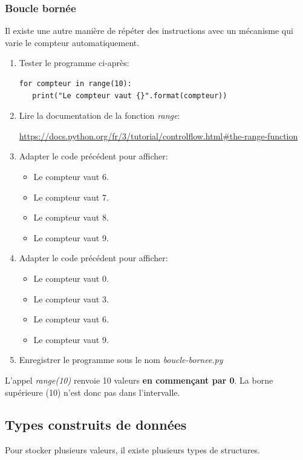 \documentclass[a4paper,11pt]{article}
\begin{document}
\begin{Form}
\subsubsection{Boucle bornée}
Il existe une autre manière de répéter des instructions avec un mécanisme qui varie le compteur automatiquement.
\begin{activite}
\begin{enumerate}
\item Tester le programme ci-après:
\begin{lstlisting}
for compteur in range(10):
   print("Le compteur vaut {}".format(compteur))
\end{lstlisting}
\item Lire la documentation de la fonction \emph{range}:
\begin{center}
\url{https://docs.python.org/fr/3/tutorial/controlflow.html#the-range-function}
\end{center}
\item Adapter le code précédent pour afficher:
\begin{itemize}
\item Le compteur vaut 6.
\item Le compteur vaut 7.
\item Le compteur vaut 8.
\item Le compteur vaut 9.
\end{itemize}
\item Adapter le code précédent pour afficher:
\begin{itemize}
\item Le compteur vaut 0.
\item Le compteur vaut 3.
\item Le compteur vaut 6.
\item Le compteur vaut 9.
\end{itemize}
\item Enregistrer le programme sous le nom \emph{boucle-bornee.py}
\end{enumerate}
\end{activite}
\begin{aretenir}
L'appel \emph{range(10)} renvoie 10 valeurs \textbf{en commençant par 0}. La borne supérieure (10) n'est donc pas dans l'intervalle.
\end{aretenir}
\subsection{Types construits de données}
Pour stocker plusieurs valeurs, il existe plusieurs types de structures.

\end{Form}
\end{document}
